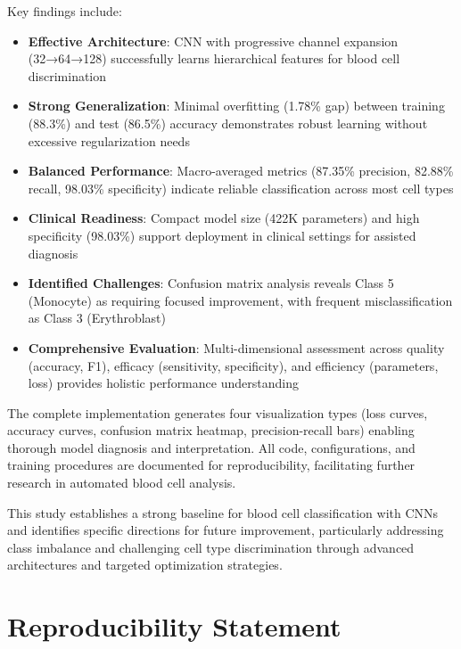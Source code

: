 \documentclass[runningheads]{llncs}
\begin{document}
Key findings include:
\begin{itemize}
    \item \textbf{Effective Architecture}: CNN with progressive channel expansion (32→64→128) successfully learns hierarchical features for blood cell discrimination
    
    \item \textbf{Strong Generalization}: Minimal overfitting (1.78\% gap) between training (88.3\%) and test (86.5\%) accuracy demonstrates robust learning without excessive regularization needs
    
    \item \textbf{Balanced Performance}: Macro-averaged metrics (87.35\% precision, 82.88\% recall, 98.03\% specificity) indicate reliable classification across most cell types
    
    \item \textbf{Clinical Readiness}: Compact model size (422K parameters) and high specificity (98.03\%) support deployment in clinical settings for assisted diagnosis
    
    \item \textbf{Identified Challenges}: Confusion matrix analysis reveals Class 5 (Monocyte) as requiring focused improvement, with frequent misclassification as Class 3 (Erythroblast)
    
    \item \textbf{Comprehensive Evaluation}: Multi-dimensional assessment across quality (accuracy, F1), efficacy (sensitivity, specificity), and efficiency (parameters, loss) provides holistic performance understanding
\end{itemize}

The complete implementation generates four visualization types (loss curves, accuracy curves, confusion matrix heatmap, precision-recall bars) enabling thorough model diagnosis and interpretation. All code, configurations, and training procedures are documented for reproducibility, facilitating further research in automated blood cell analysis.

This study establishes a strong baseline for blood cell classification with CNNs and identifies specific directions for future improvement, particularly addressing class imbalance and challenging cell type discrimination through advanced architectures and targeted optimization strategies.

\section*{Reproducibility Statement}
\end{document}
